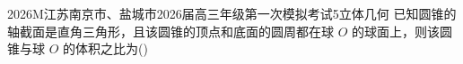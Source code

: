 
\begin{problem}{2026}{M}{江苏南京市、盐城市2026届高三年级第一次模拟考试}{5}{立体几何}
已知圆锥的轴截面是直角三角形，且该圆锥的顶点和底面的圆周都在球 $O$ 的球面上，则该圆锥与球 $O$ 的体积之比为(\hspace{1cm})
\begin{choices}
\end{choices}
\end{problem}